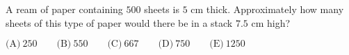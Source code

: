 

A ream of paper containing $500$ sheets is $5$ cm thick. Approximately how many sheets of this type of paper would there be in a stack $7.5$ cm high?

$\text{(A)}\ 250 \qquad \text{(B)}\ 550 \qquad \text{(C)}\ 667 \qquad \text{(D)}\ 750 \qquad \text{(E)}\ 1250$
